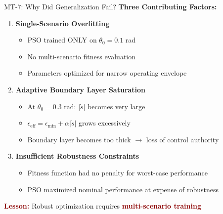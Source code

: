 \documentclass[10pt,aspectratio=169]{beamer}
\newcommand{\emphred}[1]{\textcolor{darkred}{\textbf{#1}}}
\begin{document}
\begin{frame}{MT-7: Why Did Generalization Fail?}
\textbf{Three Contributing Factors:}

\begin{enumerate}
    \item \textbf{Single-Scenario Overfitting}
    \begin{itemize}
        \item PSO trained ONLY on $\theta_0 = 0.1$ rad
        \item No multi-scenario fitness evaluation
        \item Parameters optimized for narrow operating envelope
    \end{itemize}

    \item \textbf{Adaptive Boundary Layer Saturation}
    \begin{itemize}
        \item At $\theta_0 = 0.3$ rad: $|\dot{s}|$ becomes very large
        \item $\epsilon_{\text{eff}} = \epsilon_{\min} + \alpha |\dot{s}|$ grows excessively
        \item Boundary layer becomes too thick $\rightarrow$ loss of control authority
    \end{itemize}

    \item \textbf{Insufficient Robustness Constraints}
    \begin{itemize}
        \item Fitness function had no penalty for worst-case performance
        \item PSO maximized nominal performance at expense of robustness
    \end{itemize}
\end{enumerate}

\vspace{0.3cm}
\centering
\emphred{Lesson:} Robust optimization requires \emphred{multi-scenario training}
\end{frame}
\end{document}
